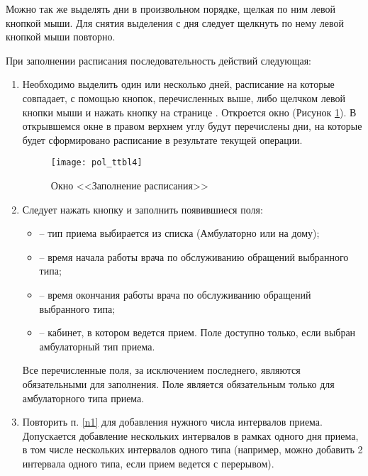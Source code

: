 Можно так же выделять дни в произвольном порядке, щелкая по ним левой кнопкой мыши. Для снятия выделения с дня следует щелкнуть по нему левой кнопкой мыши повторно.


При заполнении расписания последовательность действий следующая: 
\begin{enumerate}
 \item \label{n2} Необходимо выделить один или несколько дней, расписание на которые совпадает, с помощью кнопок, перечисленных выше, либо щелчком левой кнопки мыши и нажать кнопку  на странице . Откроется окно  (Рисунок \ref{img_pol_ttbl4}). В открывшемся окне в правом верхнем углу будут перечислены дни, на которые будет сформировано расписание в результате текущей операции. 

 \begin{figure}[ht]\centering
  \texttt{[image: pol\_ttbl4]}
  \caption{Окно <<Заполнение расписания>>}
  \label{img_pol_ttbl4}
 \end{figure}

 \item \label{n1} Следует нажать кнопку  и заполнить появившиеся поля:
 \begin{itemize}
  \item {} -- тип приема выбирается из списка (Амбулаторно или на дому);
  \item {} -- время начала работы врача по обслуживанию обращений выбранного типа;
  \item {} -- время окончания работы врача по обслуживанию обращений выбранного типа;
  \item {} -- кабинет, в котором ведется прием. Поле доступно только, если выбран амбулаторный тип приема.
 \end{itemize}
 Все перечисленные поля, за исключением последнего, являются обязательными для заполнения.  Поле  является обязательным только для амбулаторного типа приема.

 \item Повторить п. \ref{n1} для добавления нужного числа интервалов приема. Допускается добавление нескольких интервалов в рамках одного дня приема, в том числе нескольких интервалов одного типа (например, можно добавить 2 интервала одного типа, если прием ведется с перерывом). 


\end{enumerate}

